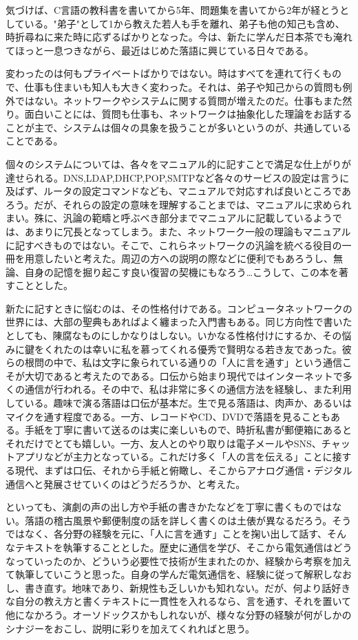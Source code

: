 気づけば、C言語の教科書を書いてから5年、問題集を書いてから2年が経とうとしている。"弟子"として1から教えた若人も手を離れ、弟子も他の知己も含め、時折尋ねに来た時に応ずるばかりとなった。今は、新たに学んだ日本茶でも淹れてほっと一息つきながら、最近はじめた落語に興じている日々である。

変わったのは何もプライベートばかりではない。時はすべてを連れて行くもので、仕事も住まいも知人も大きく変わった。それは、弟子や知己からの質問も例外ではない。ネットワークやシステムに関する質問が増えたのだ。仕事もまた然り。面白いことには、質問も仕事も、ネットワークは抽象化した理論をお話することが主で、システムは個々の具象を扱うことが多いというのが、共通していることである。

個々のシステムについては、各々をマニュアル的に記すことで満足な仕上がりが達せられる。DNS,LDAP,DHCP,POP,SMTPなど各々のサービスの設定は言うに及ばず、ルータの設定コマンドなども、マニュアルで対応すれば良いところであろう。だが、それらの設定の意味を理解することまでは、マニュアルに求められまい。殊に、汎論の範疇と呼ぶべき部分までマニュアルに記載しているようでは、あまりに冗長となってしまう。また、ネットワーク一般の理論もマニュアルに記すべきものではない。そこで、これらネットワークの汎論を統べる役目の一冊を用意したいと考えた。周辺の方への説明の際などに便利でもあろうし、無論、自身の記憶を掘り起こす良い復習の契機にもなろう…こうして、この本を著すこととした。

新たに記すときに悩むのは、その性格付けである。コンピュータネットワークの世界には、大部の聖典もあればよく纏まった入門書もある。同じ方向性で書いたとしても、陳腐なものにしかなりはしない。いかなる性格付けにするか、その悩みに鍵をくれたのは幸いに私を慕ってくれる優秀で賢明なる若き友であった。彼らの根問の中で、私は文字に象られている通りの「人に言を通す」という通信こそが大切であると考えたのである。口伝から始まり現代ではインターネットで多くの通信が行われる。その中で、私は非常に多くの通信方法を経験し、また利用している。趣味で演る落語は口伝が基本だ。生で見る落語は、肉声か、あるいはマイクを通す程度である。一方、レコードやCD、DVDで落語を見ることもある。手紙を丁寧に書いて送るのは実に楽しいもので、時折私書が郵便箱にあるとそれだけでとても嬉しい。一方、友人とのやり取りは電子メールやSNS、チャットアプリなどが主力となっている。これだけ多く「人の言を伝える」ことに接する現代、まずは口伝、それから手紙と俯瞰し、そこからアナログ通信・デジタル通信へと発展させていくのはどうだろうか、と考えた。

といっても、演劇の声の出し方や手紙の書きかたなどを丁寧に書くものではない。落語の稽古風景や郵便制度の話を詳しく書くのは土俵が異なるだろう。そうではなく、各分野の経験を元に、「人に言を通す」ことを掬い出して話す、そんなテキストを執筆することとした。歴史に通信を学び、そこから電気通信はどうなっていったのか、どういう必要性で技術が生まれたのか、経験から考察を加えて執筆していこうと思った。自身の学んだ電気通信を、経験に従って解釈しなおし、書き直す。地味であり、新規性も乏しいかも知れない。だが、何より話好きな自分の教え方と書くテキストに一貫性を入れるなら、言を通す、それを置いて他になかろう。オーソドックスかもしれないが、様々な分野の経験が何がしかのシナジーをおこし、説明に彩りを加えてくれればと思う。

